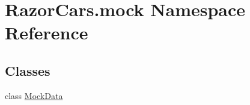\hypertarget{namespace_razor_cars_1_1mock}{}\section{Razor\+Cars.\+mock Namespace Reference}
\label{namespace_razor_cars_1_1mock}
\subsection*{Classes}
\begin{DoxyCompactItemize}
\item 
class \mbox{\hyperlink{class_razor_cars_1_1mock_1_1_mock_data}{Mock\+Data}}
\end{DoxyCompactItemize}
